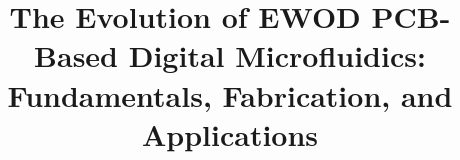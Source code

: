 \documentclass[conference,a4paper]{IEEEtran}
\makeatletter
\newcommand{\linebreakand}{%
  \end{@IEEEauthorhalign}
  \hfill\mbox{}\par
  \mbox{}\hfill\begin{@IEEEauthorhalign}
}
\makeatother
\begin{document}
\title{The Evolution of EWOD PCB-Based Digital Microfluidics: Fundamentals, Fabrication, and Applications
}

\maketitle
\end{document}
